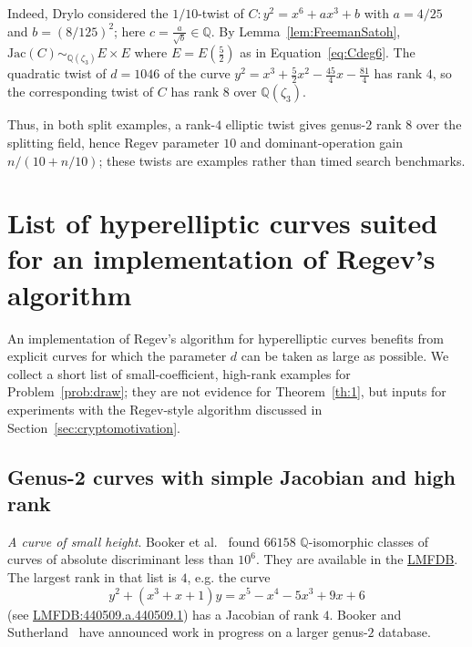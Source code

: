 \documentclass{amsart}
\newcommand{\Q}{{\mathbb Q}}
\newcommand{\Jac}{\mathrm{Jac}}
\begin{document}
Indeed, Drylo considered the $1/10$-twist of $C:y^2=x^6+ax^3+b$ with $a=4/25$ and $b=(8/125)^2$; here $c=\frac{a}{\sqrt{b}}\in \Q$. By Lemma~\ref{lem:FreemanSatoh}, $\Jac(C)\sim_{\Q(\zeta_3)} E\times E$ where $E=E(\frac{5}{2})$ as in Equation~\eqref{eq:Cdeg6}. The quadratic twist of $d=1046$ of the curve $y^2 = x^3 + \frac{5}{2}x^2 - \frac{45}{4}x - \frac{81}{4}$ has rank $4$, so the corresponding twist of $C$ has rank $8$ over $\Q(\zeta_3)$. 

Thus, in both split examples, a rank-$4$ elliptic twist gives genus-$2$
rank $8$ over the splitting field, hence Regev parameter $10$ and
dominant-operation gain $n/(10+n/10)$; these twists are examples rather than
timed search benchmarks.

\appendix

\section{List of hyperelliptic curves suited for an implementation of Regev's algorithm}\label{appendix}

An implementation of Regev's algorithm for hyperelliptic curves benefits from
explicit curves for which the parameter $d$ can be taken as large as possible.
We collect a short list of small-coefficient, high-rank examples for
Problem~\ref{prob:draw}; they are not evidence for Theorem~\ref{th:1}, but
inputs for experiments with the Regev-style algorithm discussed in
Section~\ref{sec:cryptomotivation}.


\subsection{Genus-2 curves with simple Jacobian and high rank}\label{ssec:simple}
\emph{A curve of small height}.
Booker et al.~\cite{Booker2016} found $66158$ $\Q$-isomorphic classes of curves 
of absolute discriminant less than $10^6$.
They are available in the \href{https://www.lmfdb.org/Genus2Curve/Q/}{LMFDB}.
The largest rank in that list is $4$, e.g. the curve
\[
y^2+(x^3+x+1)y=x^5-x^4-5x^3+9x+6
\]
(see \href{https://www.lmfdb.org/Genus2Curve/Q/440509/a/440509/1}{LMFDB:440509.a.440509.1})
has a Jacobian of rank $4$. Booker and Sutherland~\cite{Sutherland2026} have
announced work in progress on a larger genus-$2$ database.

\medskip
\end{document}
